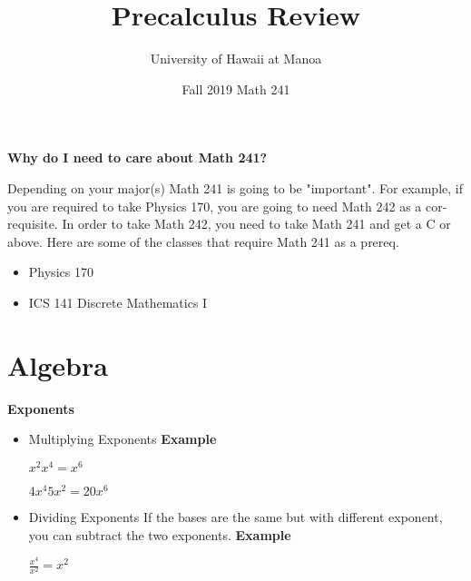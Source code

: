 \documentclass{article}
\title{Precalculus Review}
\author{University of Hawaii at Manoa}
\date{Fall 2019 Math 241}
\begin{document}
\maketitle 
{}
\begin{center}
    \textbf{Why do I need to care about Math 241?}
\end{center}
Depending on your major(s) Math 241 is going to be "important". For example, if you are required to take Physics 170, you are going to need Math 242 as a cor-requisite. In order to take Math 242, you need to take Math 241 and get a C or above. \newline 
Here are some of the classes that require Math 241 as a prereq.
\begin{itemize}
    \item Physics 170 
    \item ICS 141 Discrete Mathematics I 
\end{itemize}
\newpage
\section{Algebra}
\textbf{Exponents}
\begin{itemize} 
    \item Multiplying Exponents \newline
    \newline
    \textbf{Example} \newline
    \begin{center}
    $
    x^{2}x^{4} =x^{6}
    $
    \end{center}
    \newline
    \begin{center} 
    $
    4x^{4}5x^{2}=20x^{6}
    $
    \end{center}
    \item Dividing Exponents \newline
    If the bases are the same but with different exponent, you can subtract the two exponents. \newline 
    \textbf{Example} \newline
    \begin{center}
        $
        \frac{x^{4}}{x^{2}}=x^{2}
        $
    \end{center}
    
\end{itemize}
\end{document}
